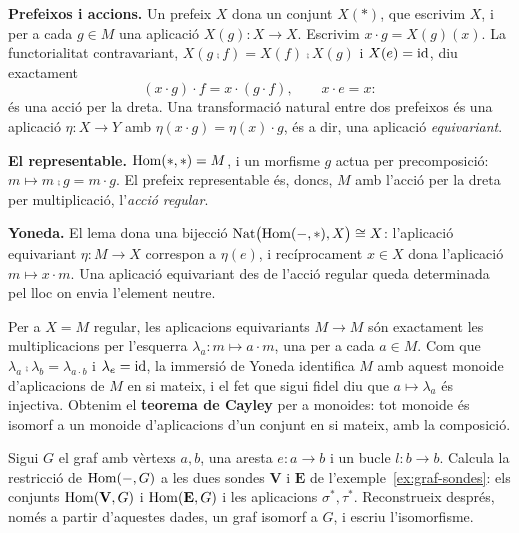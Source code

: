 \begin{solucio}
\textbf{Prefeixos i accions.} Un prefeix $X$ dona un conjunt $X(\ast)$, que escrivim $X$, i per a cada $g\in M$ una aplicació $X(g)\colon X\to X$. Escrivim $x\cdot g=X(g)(x)$. La functorialitat contravariant, $X(g\comp f)=X(f)\comp X(g)$ i $X(e)=\operatorname{id}$, diu exactament
\[
(x\cdot g)\cdot f=x\cdot(g\cdot f),
\qquad
x\cdot e=x:
\]
és una acció per la dreta. Una transformació natural entre dos prefeixos és una aplicació $\eta\colon X\to Y$ amb $\eta(x\cdot g)=\eta(x)\cdot g$, és a dir, una aplicació \emph{equivariant}.

\textbf{El representable.} $\operatorname{Hom}(\ast,\ast)=M$, i un morfisme $g$ actua per precomposició: $m\mapsto m\comp g=m\cdot g$. El prefeix representable és, doncs, $M$ amb l'acció per la dreta per multiplicació, l'\emph{acció regular}.

\textbf{Yoneda.} El lema dona una bijecció $\operatorname{Nat}\bigl(\operatorname{Hom}(-,\ast),X\bigr)\cong X$: l'aplicació equivariant $\eta\colon M\to X$ correspon a $\eta(e)$, i recíprocament $x\in X$ dona l'aplicació $m\mapsto x\cdot m$. Una aplicació equivariant des de l'acció regular queda determinada pel lloc on envia l'element neutre.

Per a $X=M$ regular, les aplicacions equivariants $M\to M$ són exactament les multiplicacions per l'esquerra $\lambda_a\colon m\mapsto a\cdot m$, una per a cada $a\in M$. Com que $\lambda_a\comp\lambda_b=\lambda_{a\cdot b}$ i $\lambda_e=\operatorname{id}$, la immersió de Yoneda identifica $M$ amb aquest monoide d'aplicacions de $M$ en si mateix, i el fet que sigui fidel diu que $a\mapsto\lambda_a$ és injectiva. Obtenim el \textbf{teorema de Cayley} per a monoides: tot monoide és isomorf a un monoide d'aplicacions d'un conjunt en si mateix, amb la composició.
\end{solucio}

\begin{exercici}\label{pr-graf-sondes}
Sigui $G$ el graf amb vèrtexs $a,b$, una aresta $e\colon a\to b$ i un bucle $l\colon b\to b$. Calcula la restricció de $\operatorname{Hom}(-,G)$ a les dues sondes $\mathbf V$ i $\mathbf E$ de l'exemple~\ref{ex:graf-sondes}: els conjunts $\operatorname{Hom}(\mathbf V,G)$ i $\operatorname{Hom}(\mathbf E,G)$ i les aplicacions $\sigma^*,\tau^*$. Reconstrueix després, només a partir d'aquestes dades, un graf isomorf a $G$, i escriu l'isomorfisme.
\end{exercici}

